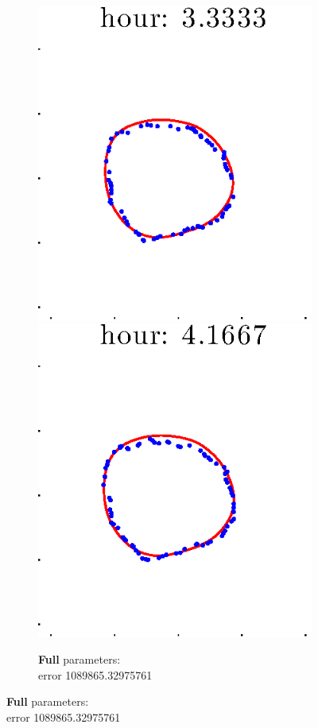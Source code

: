 \documentclass[12pt]{article}
\begin{document}
\begin{figure}[h!]
\begin{subfigure}[b]{.3\textwidth}
		\includegraphics[height=.15\textheight]{Pos5exp2/firsthalf/full5.eps}
		\includegraphics[height=.15\textheight]{Pos5exp2/firsthalf/full6.eps}
		\caption{\textbf{Full} parameters: \\error 1089865.32975761}

\end{subfigure}
\end{figure}
\end{document}
